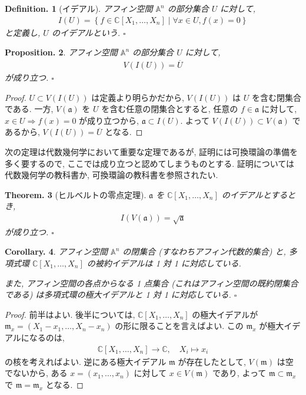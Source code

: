 \documentclass[openany, a4paper, oneside]{jsbook}
\theoremstyle{break}
\theoremstyle{breakdefn}
\newtheorem{thm}{Theorem.}[section]
\newtheorem{cor}[thm]{Corollary.}
\newtheorem{prop}[thm]{Proposition.}
\newtheorem{defn}[thm]{Definition.}
\newcommand{\relmiddle}[1]{\mathrel{}\middle#1\mathrel{}}
\newcommand{\set}[2]{\left\{#1 \relmiddle| #2\right\}}
\newcommand{\fin}{\hfill $\square$ \par}
\begin{document}
\begin{defn}[イデアル]
アフィン空間 $\mathbb{A}^n$ の部分集合 $U$ に対して,
\begin{align}
 I (U)
 =
 \set{f \in \mathbb{C}[X_1, \dots, X_n]}{\forall x \in U, f(x) = 0}
\end{align}
と定義し,  $U$ のイデアルという. \fin
\end{defn}
\begin{prop}
アフィン空間 $\mathbb{A}^n$ の部分集合 $U$ に対して,
\begin{align}
 V ( I ( U ) )
 =
 \overline{U}
\end{align}
が成り立つ. \fin
\end{prop}
\begin{proof}
$U \subset V ( I ( U ) ) $ は定義より明らかだから,
$V ( I ( U ) )$ は $U$ を含む閉集合である.
一方, $V ( \mathfrak{a} )$ を $U$ を含む任意の閉集合とすると,
任意の $f \in \mathfrak{a}$ に対して, $x \in U \Rightarrow f (x) = 0$ が成り立つから,
$ \mathfrak{a} \subset I ( U )$.
よって $V ( I ( U ) ) \subset V ( \mathfrak{a} ) $ であるから,  $V ( I ( U ) ) = \overline{U} $ となる.
\end{proof}

次の定理は代数幾何学において重要な定理であるが,
証明には可換環論の準備を多く要するので, ここでは成り立つと認めてしまうものとする.
証明については代数幾何学の教科書か, 可換環論の教科書を参照されたい.
\begin{thm}[ヒルベルトの零点定理]
 $\mathfrak{a}$ を $\mathbb{C}[X_1, \dots, X_n]$ のイデアルとするとき,
 \begin{align}
  I (V ( \mathfrak{a} ) )
  =
  \sqrt{ \mathfrak{a} }
 \end{align}
が成り立つ. \fin
\end{thm}
\begin{cor}\label{waheyhey-algebraic-geometry-guidance3}
 アフィン空間 $\mathbb{A}^n$ の閉集合 (すなわちアフィン代数的集合) と,
 多項式環 $\mathbb{C}[X_1, \dots, X_n]$ の被約イデアルは 1 対 1 に対応している.

 また, アフィン空間の各点からなる 1 点集合 (これはアフィン空間の既約閉集合である) は多項式環の極大イデアルと 1 対 1 に対応している. \fin
\end{cor}
\begin{proof}
前半はよい.
後半については, $\mathbb{C}[X_1, \dots, X_n]$ の極大イデアルが
$\mathfrak{m}_x = (X_1 - x_1, \dots, X_n - x_n)$ の形に限ることを言えばよい.
この $\mathfrak{m}_x$ が極大イデアルになるのは,
\begin{align}
 \mathbb{C}[X_1, \dots, X_n]
 \longrightarrow
 \mathbb{C}, \quad X_i \mapsto x_i
\end{align}
の核を考えればよい.
逆にある極大イデアル $\mathfrak{m}$ が存在したとして, $V ( \mathfrak{m} )$ は空でないから,
ある $x = (x_1, \dots, x_n)$ に対して $x \in V ( \mathfrak{m} )$ であり,
よって $ \mathfrak{m} \subset \mathfrak{m}_x$ で $ \mathfrak{m} = \mathfrak{m}_x$ となる.
\end{proof}
\end{document}
